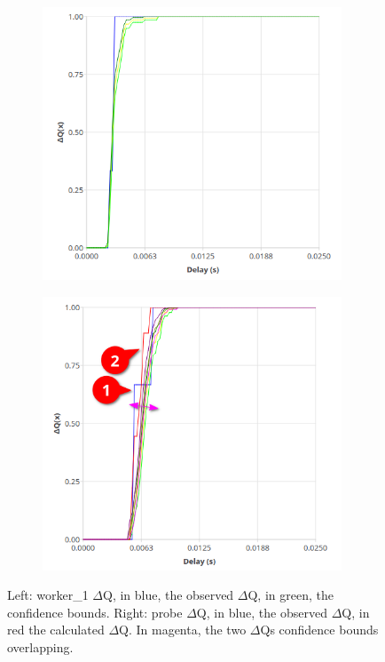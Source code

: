         \begin{figure}[H]
            \centering
            \begin{subfigure}{.5\textwidth}
                \centering
                \includegraphics[width=0.98\textwidth]{img/overload_2/50_worker.png}
                \label{fig:norm_ex_1}
            \end{subfigure}%
            \begin{subfigure}{.5\textwidth}
                \centering
                \includegraphics[width =0.98\textwidth]{img/overload_2/50_probe2.png}
                \label{fig:norm_ex_2}
            \end{subfigure}
            \label{fig:norm_ex}
            \caption{Left: worker\_1 $\Delta$Q, in blue, the observed $\Delta$Q, in green, the confidence bounds. Right: probe $\Delta$Q, in blue, the observed $\Delta$Q, in red the calculated $\Delta$Q. In magenta, the two $\Delta$Qs confidence bounds overlapping.}
        \end{figure}
    
